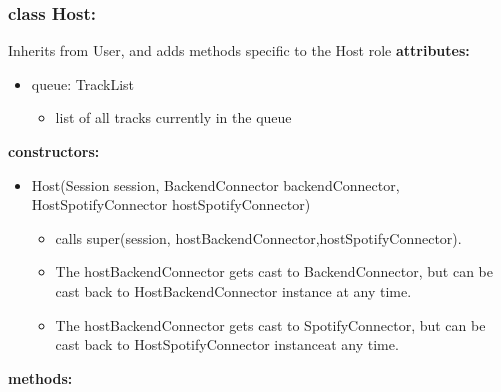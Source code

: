 \documentclass[oneside, nenglish]{sdqtechreport}
\begin{document}
\subsubsection{class Host:}
Inherits from User, and adds methods specific to the Host role 
\textbf{attributes:}
\begin{itemize}
    \item queue: TrackList
    \begin{itemize}
        \item list of all tracks currently in the queue
    \end{itemize}
\end{itemize}
\textbf{constructors:}
\begin{itemize}
    \item Host(Session session, BackendConnector backendConnector, HostSpotifyConnector hostSpotifyConnector)
    \begin{itemize}
        \item calls super(session, hostBackendConnector,hostSpotifyConnector).
        \item The hostBackendConnector gets cast to BackendConnector, but can be cast back to HostBackendConnector instance at any time.
        \item The hostBackendConnector gets cast to SpotifyConnector, but can be cast back to HostSpotifyConnector instanceat any time.
        
    \end{itemize}
\end{itemize}
\textbf{methods:}
\end{document}
